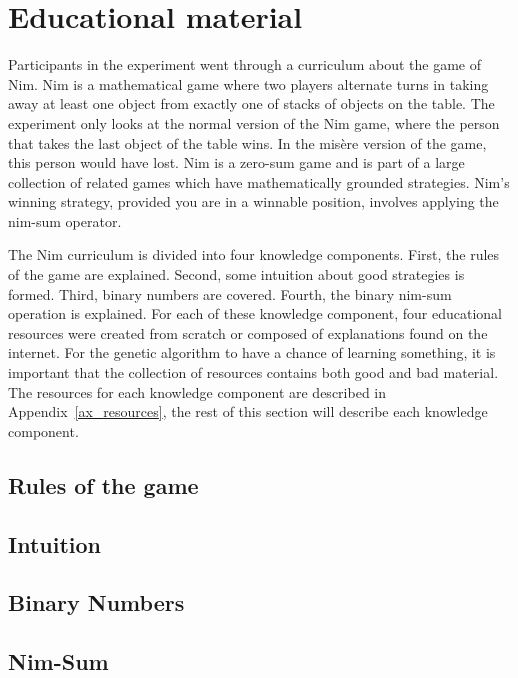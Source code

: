 \section{Educational material}
Participants in the experiment went through a curriculum about the game of Nim.
Nim is a mathematical game where two players alternate turns in taking away at
least one object from exactly one of stacks of objects on the table. The
experiment only looks at the normal version of the Nim game, where the person
that takes the last object of the table wins. In the mis\`{e}re version of the
game, this person would have lost. Nim is a zero-sum game and is part of a
large collection of related games which have mathematically grounded
strategies. Nim's winning strategy, provided you are in a winnable position,
involves applying the nim-sum operator. %

The Nim curriculum is divided into four knowledge components. First, the rules
of the game are explained. Second, some intuition about good strategies is formed.
Third, binary numbers are covered. Fourth, the binary nim-sum operation is
explained. For each of these knowledge component, four educational resources
were created from scratch or composed of explanations found on the internet.
For the genetic algorithm to have a chance of learning something, it is
important that the collection of resources contains both good and bad material.
The resources for each knowledge component are described in
Appendix~\ref{ax_resources}, the rest of this section will describe
each knowledge component.
\subsection{Rules of the game}
\subsection{Intuition}
\subsection{Binary Numbers}
\subsection{Nim-Sum}

